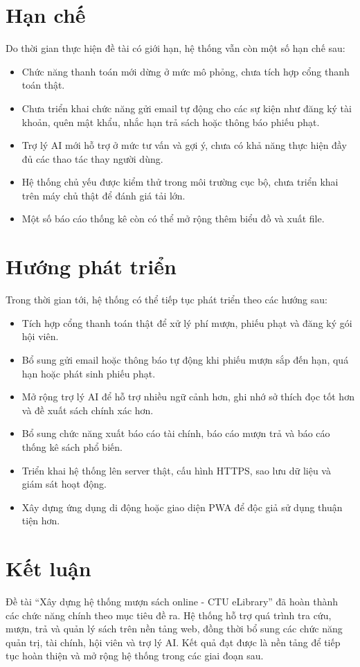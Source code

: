 \documentclass[../main.tex]{subfiles}
\begin{document}
\section{Hạn chế}

Do thời gian thực hiện đề tài có giới hạn, hệ thống vẫn còn một số hạn chế sau:

\begin{itemize}
    \item Chức năng thanh toán mới dừng ở mức mô phỏng, chưa tích hợp cổng thanh toán thật.
    \item Chưa triển khai chức năng gửi email tự động cho các sự kiện như đăng ký tài khoản, quên mật khẩu, nhắc hạn trả sách hoặc thông báo phiếu phạt.
    \item Trợ lý AI mới hỗ trợ ở mức tư vấn và gợi ý, chưa có khả năng thực hiện đầy đủ các thao tác thay người dùng.
    \item Hệ thống chủ yếu được kiểm thử trong môi trường cục bộ, chưa triển khai trên máy chủ thật để đánh giá tải lớn.
    \item Một số báo cáo thống kê còn có thể mở rộng thêm biểu đồ và xuất file.
\end{itemize}

\section{Hướng phát triển}

Trong thời gian tới, hệ thống có thể tiếp tục phát triển theo các hướng sau:

\begin{itemize}
    \item Tích hợp cổng thanh toán thật để xử lý phí mượn, phiếu phạt và đăng ký gói hội viên.
    \item Bổ sung gửi email hoặc thông báo tự động khi phiếu mượn sắp đến hạn, quá hạn hoặc phát sinh phiếu phạt.
    \item Mở rộng trợ lý AI để hỗ trợ nhiều ngữ cảnh hơn, ghi nhớ sở thích đọc tốt hơn và đề xuất sách chính xác hơn.
    \item Bổ sung chức năng xuất báo cáo tài chính, báo cáo mượn trả và báo cáo thống kê sách phổ biến.
    \item Triển khai hệ thống lên server thật, cấu hình HTTPS, sao lưu dữ liệu và giám sát hoạt động.
    \item Xây dựng ứng dụng di động hoặc giao diện PWA để độc giả sử dụng thuận tiện hơn.
\end{itemize}

\section{Kết luận}

Đề tài ``Xây dựng hệ thống mượn sách online - CTU eLibrary'' đã hoàn thành các chức năng chính theo mục tiêu đề ra. Hệ thống hỗ trợ quá trình tra cứu, mượn, trả và quản lý sách trên nền tảng web, đồng thời bổ sung các chức năng quản trị, tài chính, hội viên và trợ lý AI. Kết quả đạt được là nền tảng để tiếp tục hoàn thiện và mở rộng hệ thống trong các giai đoạn sau.
\end{document}
